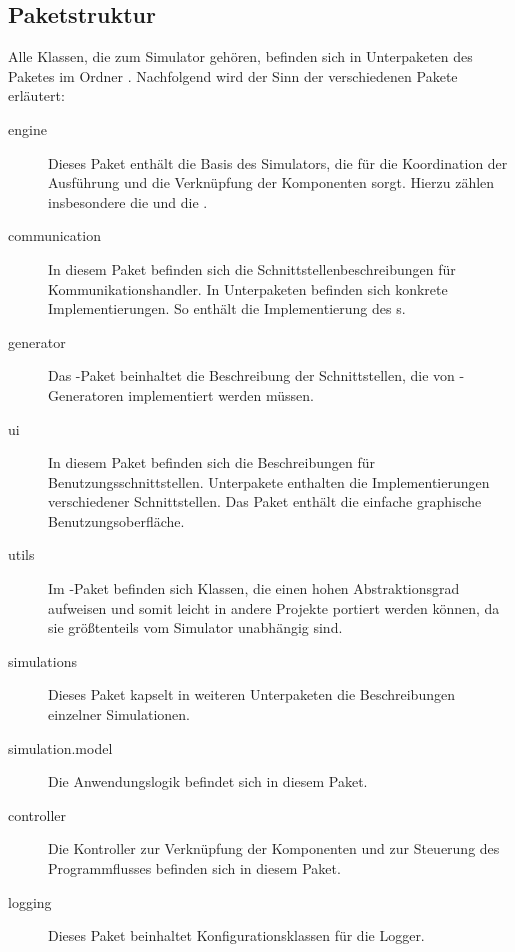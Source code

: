 \subsection{Paketstruktur}
Alle Klassen, die zum Simulator gehören, befinden sich in Unterpaketen des Paketes  im Ordner .
Nachfolgend wird der Sinn der verschiedenen Pakete erläutert:
\begin{description}
	\item[engine] Dieses Paket enthält die Basis des Simulators, die für die Koordination der Ausführung und die Verknüpfung der Komponenten sorgt. Hierzu zählen insbesondere die  und die .
	\item[communication] In diesem Paket befinden sich die Schnittstellenbeschreibungen für Kommunikationshandler. In Unterpaketen befinden sich konkrete Implementierungen. So enthält  die Implementierung des s.
	\item[generator] Das -Paket beinhaltet die Beschreibung der Schnittstellen, die von -Generatoren implementiert werden müssen.
	\item[ui] In diesem Paket befinden sich die Beschreibungen für Benutzungsschnittstellen. Unterpakete enthalten die Implementierungen verschiedener Schnittstellen. Das Paket  enthält die einfache graphische Benutzungsoberfläche.
	\item[utils] Im -Paket befinden sich Klassen, die einen hohen Abstraktionsgrad aufweisen und somit leicht in andere Projekte portiert werden können, da sie größtenteils vom Simulator unabhängig sind.
	\item[simulations] Dieses Paket kapselt in weiteren Unterpaketen die Beschreibungen einzelner Simulationen.
	\item[simulation.model] Die Anwendungslogik befindet sich in diesem Paket.
	\item[controller] Die Kontroller zur Verknüpfung der Komponenten und zur Steuerung des Programmflusses befinden sich in diesem Paket.
	\item[logging] Dieses Paket beinhaltet Konfigurationsklassen für die Logger.
\end{description}

